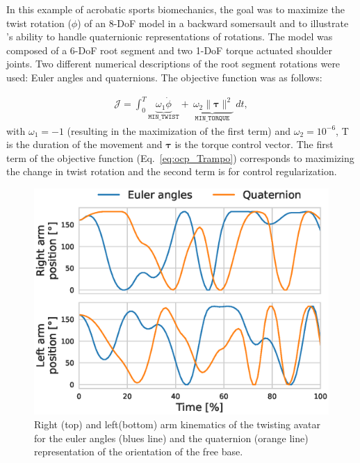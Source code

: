 In this example of acrobatic sports biomechanics, the goal was to maximize the twist rotation ($\phi$) of an 8-DoF model in a backward somersault and to illustrate \bioptim 's ability to handle quaternionic representations of rotations.
The model was composed of a 6-DoF root segment and two 1-DoF torque actuated shoulder joints.
Two different numerical descriptions of the root segment rotations were used: Euler angles and quaternions.
The objective function was as follows:

\begin{eqnarray}\label{eq:ocp_Trampo}
\mathcal{J} =  \int_0^T\underbrace{\omega_1 \dot{\phi}}_{\mathtt{MIN\_TWIST}}  + \underbrace{~\omega_2  \|\boldsymbol{\tau}\|^2}_{\mathtt{MIN\_ TORQUE}}~dt,
\end{eqnarray} 
with $\omega_1 = -1$ (resulting in the maximization of the first term) and $\omega_2 = 10^{-6}$, T is the duration of the movement and $\boldsymbol{\tau}$ is the torque control vector.
The first term of the objective function (Eq.~\ref{eq:ocp_Trampo}) corresponds to maximizing the change in twist rotation and the second term is for control regularization.
\begin{figure}[t!]
\centering
\includegraphics[width=\columnwidth]{figures/Twisting_armTech.eps}
\caption{Right (top) and left(bottom) arm kinematics of the twisting avatar for the euler angles (blues line) and the quaternion (orange line) representation of the orientation of the free base.}
\label{fig:Twist_armTech_graphs}
\vspace*{-1cm}
\end{figure}

